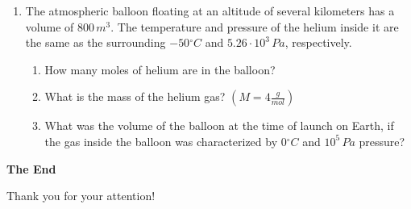 \documentclass[t,aspectratio=169]{beamer}
\begin{document}
\begin{frame}
\begin{itemize}
\begin{enumerate}
\item The atmospheric balloon floating at an altitude of several kilometers has a volume of $800\,m^{3}$. The temperature and pressure of the helium inside it are the same as the surrounding $-50{}^{\circ}C$ and $5.26 \cdot 10^{3}\,Pa$, respectively.
\begin{enumerate}
\item[(a)] How many moles of helium are in the balloon?
\item[(b)] What is the mass of the helium gas? $\left(M = 4 \frac{g}{mol}\right)$
\item[(c)] What was the volume of the balloon at the time of launch on Earth, if the gas inside the balloon was characterized by $0{}^{\circ}C$ and $10^{5}\,Pa$ pressure?
\end{enumerate}
\end{enumerate}

\end{itemize}

\end{frame}


\begin{frame}

\vfill
\begin{center}
\textbf{\huge The End}

\bigskip
Thank you for your attention!
\end{center}
\vfill
\end{frame}
\end{document}
